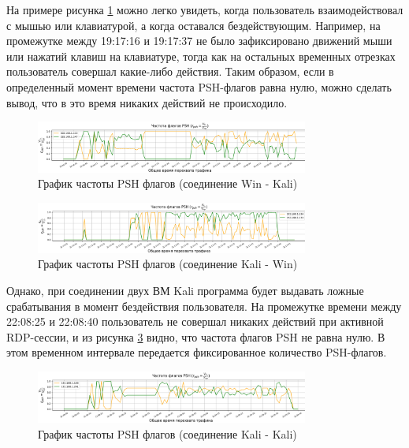 \documentclass[bachelor, och, coursework]{SCWorks}
\begin{document}
На примере рисунка \ref{winkal-psh} можно легко увидеть, когда пользователь взаимодействовал с мышью или клавиатурой, а когда оставался 
бездействующим. Например, на промежутке между 19:17:16 и 19:17:37 не было зафиксировано движений мыши или нажатий клавиш на клавиатуре, 
тогда как на остальных временных отрезках пользователь совершал какие-либо действия. Таким образом, если в определенный момент времени 
частота PSH-флагов равна нулю, можно сделать вывод, что в это время никаких действий не происходило.

\begin{figure}[H]
  \centering
  \includegraphics[width=0.8\textwidth]{photo/psh-winkal.png}
  \caption{График частоты PSH флагов (соединение Win - Kali)}
  \label{winkal-psh}
\end{figure}


\begin{figure}[H]
  \centering
  \includegraphics[width=0.8\textwidth]{photo/psh-kalwin.png}
  \caption{График частоты PSH флагов (соединение Kali - Win)}
  \label{kalwin-psh}
\end{figure}

Однако, при соединении двух ВМ Kali программа будет выдавать ложные срабатывания в момент бездействия пользователя. На промежутке времени
между 22:08:25 и 22:08:40 пользователь не совершал никаких действий при активной RDP-сессии, и из рисунка \ref{kali-psh} видно, что частота флагов
PSH не равна нулю. В этом временном интервале передается фиксированное количество PSH-флагов. 

\begin{figure}[H]
  \centering
  \includegraphics[width=0.8\textwidth]{photo/psh-kal.png}
  \caption{График частоты PSH флагов (соединение Kali - Kali)}
  \label{kali-psh}
\end{figure}
\end{document}
